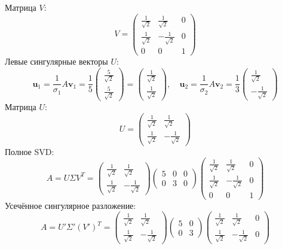 \documentclass[a4paper]{article}
\begin{document}
\begin{enumerate}
\begin{enumerate}
\begin{itemize}
  \end{itemize}
  Матрица \( V \):  
  \[
  V = \begin{pmatrix}
  \frac{1}{\sqrt{2}} & \frac{1}{\sqrt{2}} & 0 \\
  \frac{1}{\sqrt{2}} & -\frac{1}{\sqrt{2}} & 0 \\
  0 & 0 & 1
  \end{pmatrix}
  \]
  Левые сингулярные векторы \( U \):  
  \[
  \mathbf{u}_1 = \frac{1}{\sigma_1} A 
  \mathbf{v}_1 = \frac{1}{5} \begin{pmatrix} \frac{5}{\sqrt{2}} \\
     \frac{5}{\sqrt{2}} \end{pmatrix} = \begin{pmatrix} \frac{1}{\sqrt{2}} \\
       \frac{1}{\sqrt{2}} \end{pmatrix}, \quad \mathbf{u}_2 = \frac{1}{\sigma_2} A 
       \mathbf{v}_2 = \frac{1}{3} \begin{pmatrix} \frac{1}{\sqrt{2}} \\
         -\frac{1}{\sqrt{2}} \end{pmatrix}
  \]  
  Матрица \( U \):  
  \[
  U = \begin{pmatrix}
  \frac{1}{\sqrt{2}} & \frac{1}{\sqrt{2}} \\
  \frac{1}{\sqrt{2}} & -\frac{1}{\sqrt{2}}
  \end{pmatrix}
  \]
  Полное SVD:  
  \[
  A = U \Sigma V^T = \begin{pmatrix}
  \frac{1}{\sqrt{2}} & \frac{1}{\sqrt{2}} \\
  \frac{1}{\sqrt{2}} & -\frac{1}{\sqrt{2}}
  \end{pmatrix} \begin{pmatrix}
  5 & 0 & 0 \\
  0 & 3 & 0
  \end{pmatrix} \begin{pmatrix}
  \frac{1}{\sqrt{2}} & \frac{1}{\sqrt{2}} & 0 \\
  \frac{1}{\sqrt{2}} & -\frac{1}{\sqrt{2}} & 0 \\
  0 & 0 & 1
  \end{pmatrix}
  \]
  Усечённое сингулярное разложение:
  \[
  A = U' \Sigma' (V')^T = \begin{pmatrix}
  \frac{1}{\sqrt{2}} & \frac{1}{\sqrt{2}} \\
  \frac{1}{\sqrt{2}} & -\frac{1}{\sqrt{2}}
  \end{pmatrix} \begin{pmatrix}
  5 & 0 \\
  0 & 3
  \end{pmatrix} \begin{pmatrix}
  \frac{1}{\sqrt{2}} & \frac{1}{\sqrt{2}} & 0 \\
  \frac{1}{\sqrt{2}} & -\frac{1}{\sqrt{2}} & 0
  \end{pmatrix}
  \]


\end{enumerate}
\end{enumerate}
\end{document}
